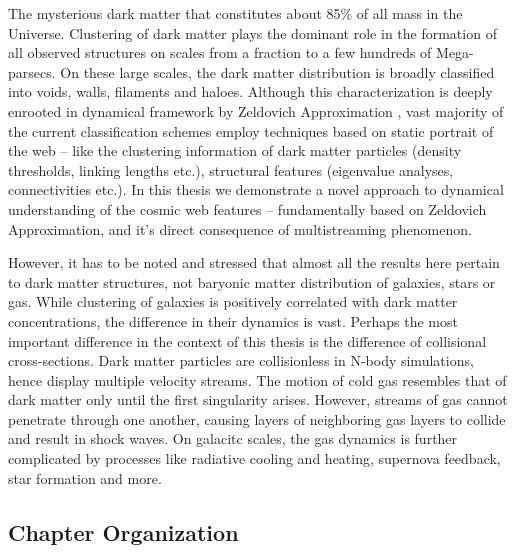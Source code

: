 The mysterious dark matter that constitutes about 85\% of all mass in the Universe. Clustering of dark matter plays the dominant role in the formation of all observed structures on scales from a fraction to a few hundreds of Mega-parsecs. On these large scales, the dark matter distribution is broadly classified into voids, walls, filaments and haloes. Although this characterization is deeply enrooted in dynamical framework by Zeldovich Approximation \cite{Zeldovich1970}, vast majority of the current classification schemes employ techniques based on static portrait of the web -- like the clustering information of dark matter particles (density thresholds, linking lengths etc.), structural features (eigenvalue analyses, connectivities etc.). In this thesis we demonstrate a novel approach to dynamical understanding of the cosmic web features -- fundamentally based on Zeldovich Approximation, and it's direct consequence of multistreaming phenomenon.   

However, it has to be noted and stressed that almost all the results here pertain to dark matter structures, not baryonic matter distribution of galaxies, stars or gas. While clustering of galaxies is positively correlated with dark matter concentrations, the difference in their dynamics is vast. Perhaps the most important difference in the context of this thesis is the difference of collisional cross-sections. Dark matter particles are collisionless in N-body simulations, hence display multiple velocity streams. The motion of cold gas resembles that of dark matter only until the first singularity arises. However, streams of gas cannot penetrate through one another, causing layers of neighboring gas layers to collide and result in shock waves. On galacitc scales, the gas dynamics is further complicated by processes like radiative cooling and heating, supernova feedback, star formation and more. 


\subsection{Chapter Organization}


